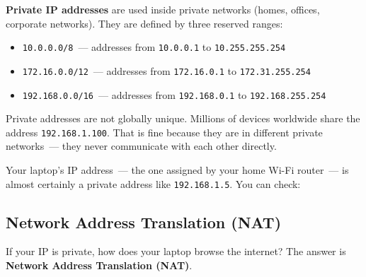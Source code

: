 \textbf{Private IP addresses} are used inside private networks (homes, offices, corporate networks). They are defined by three reserved ranges:

\begin{itemize}
\tightlist
\item
  \texttt{10.0.0.0/8}~--- addresses from \texttt{10.0.0.1} to \texttt{10.255.255.254}
\item
  \texttt{172.16.0.0/12}~--- addresses from \texttt{172.16.0.1} to \texttt{172.31.255.254}
\item
  \texttt{192.168.0.0/16}~--- addresses from \texttt{192.168.0.1} to \texttt{192.168.255.254}
\end{itemize}

\noindent{}Private addresses are not globally unique. Millions of devices worldwide share the address \texttt{192.168.1.100}. That is fine because they are in different private networks~--- they never communicate with each other directly.

Your laptop's IP address~--- the one assigned by your home Wi-Fi router~--- is almost certainly a private address like \texttt{192.168.1.5}. You can check:

\begin{codebox}[short]

\begin{Shaded}
\begin{Highlighting}[]

\end{Highlighting}
\end{Shaded}

\end{codebox}

\subsection*{Network Address Translation (NAT)}\label{10-networking-limitations:network-address-translation-nat}

If your IP is private, how does your laptop browse the internet? The answer is \textbf{Network Address Translation (NAT)}.


